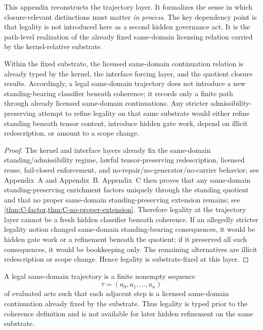 \label{app:trajectory}

This appendix reconstructs the trajectory layer. It formalizes the sense in which closure-relevant distinctions must matter \emph{in process}. The key dependency point is that legality is not introduced here as a second hidden governance act. It is the path-level realization of the already fixed same-domain licensing relation carried by the kernel-relative substrate.

\begin{proposition}
\label{prop:D-legality-fixed}
Within the fixed substrate, the licensed same-domain continuation relation is already typed by the kernel, the interface forcing layer, and the quotient closure results. Accordingly, a legal same-domain trajectory does not introduce a new standing-bearing classifier beneath coherence; it records only a finite path through already licensed same-domain continuations. Any stricter admissibility-preserving attempt to refine legality on that same substrate would either refine standing beneath tensor content, introduce hidden gate work, depend on illicit redescription, or amount to a scope change.
\end{proposition}

\begin{proof}
The kernel and interface layers already fix the same-domain standing/admissibility regime, lawful tensor-preserving redescription, licensed reuse, fail-closed enforcement, and no-repair/no-generator/no-carrier behavior; see Appendix~A and Appendix~B. Appendix~C then proves that any same-domain standing-preserving enrichment factors uniquely through the standing quotient and that no proper same-domain standing-preserving extension remains; see \cref{thm:C-factor,thm:C-no-proper-extension}. Therefore legality at the trajectory layer cannot be a fresh hidden classifier beneath coherence. If an allegedly stricter legality notion changed same-domain standing-bearing consequences, it would be hidden gate work or a refinement beneath the quotient; if it preserved all such consequences, it would be bookkeeping only. The remaining alternatives are illicit redescription or scope change. Hence legality is substrate-fixed at this layer.
\end{proof}

\begin{definition}
A legal same-domain trajectory is a finite nonempty sequence
\[
\tau=(a_0,a_1,\dots,a_n)
\]
of evaluated acts such that each adjacent step is a licensed same-domain continuation already fixed by the substrate. Thus legality is typed prior to the coherence definition and is not available for later hidden refinement on the same substrate.
\end{definition}

